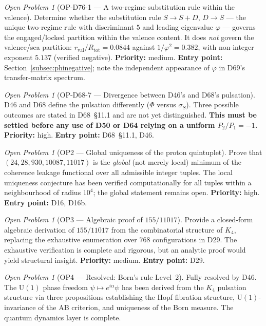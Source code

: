 \documentclass[11pt,a4paper]{article}
\theoremstyle{plain}
\theoremstyle{definition}
\theoremstyle{remark}
\newtheorem{openproblem}[theorem]{Open Problem}
\newcommand{\rval}{r_{\mathrm{val}}}
\newcommand{\Rtot}{R_{\mathrm{tot}}}
\begin{document}
\begin{openproblem}[OP-D76-1 --- A two-regime substitution rule within the valence]
\label{op:D761}
Determine whether the substitution rule $S\to S{+}D$, $D\to S$ --- the unique two-regime rule with discriminant $5$ and leading eigenvalue $\varphi$ --- governs the engaged/locked partition within the valence content. It does \emph{not} govern the valence/sea partition: $\rval/\Rtot=0.0844$ against $1/\varphi^2=0.382$, with non-integer exponent $5.137$ (verified negative). \textbf{Priority:} medium. \textbf{Entry point:} Section~\ref{subsec:phinegative}; note the independent appearance of $\varphi$ in D69's transfer-matrix spectrum.
\end{openproblem}

\begin{openproblem}[OP-D68-7 --- Divergence between D46's and D68's pulsation]
\label{op:D687}
D46 and D68 define the pulsation differently ($\Phi$ versus $\sigma_S$). Three possible outcomes are stated in D68~§11.1 and are not yet distinguished. \textbf{This must be settled before any use of D50 or D64 relying on a uniform $P_2/P_1=-1$.} \textbf{Priority:} high. \textbf{Entry point:} D68~§11.1, D46.
\end{openproblem}

\begin{openproblem}[OP2 --- Global uniqueness of the proton quintuplet]
\label{op:uniqueness}
Prove that \\  $(24, 28, 930, 10087, 11017)$ is the \emph{global} (not merely local) minimum of the coherence leakage functional over all admissible integer tuples. The local uniqueness conjecture has been verified computationally for all tuples within a neighbourhood of radius $10^4$; the global statement remains open. \textbf{Priority:} high. \textbf{Entry point:} D16, D16b.
\end{openproblem}

\begin{openproblem}[OP3 --- Algebraic proof of $155/11017$]
\label{op:gate1algebraic}
Provide a closed-form algebraic derivation of $155/11017$ from the combinatorial structure of $K_4$, replacing the exhaustive enumeration over $768$ configurations in D29. The exhaustive verification is complete and rigorous, but an analytic proof would yield structural insight. \textbf{Priority:} medium. \textbf{Entry point:} D29.
\end{openproblem}

\begin{openproblem}[OP4 --- Resolved: Born's rule Level~2]
\label{op:bornlevel2}
\textcolor{proofblue}{Fully resolved by D46.} The $\mathrm{U}(1)$ phase freedom $\psi \mapsto e^{i\alpha}\psi$ has been derived from the $K_4$ pulsation structure via three propositions establishing the Hopf fibration structure, $\mathrm{U}(1)$-invariance of the AB criterion, and uniqueness of the Born measure. The quantum dynamics layer is complete.
\end{openproblem}
\end{document}
